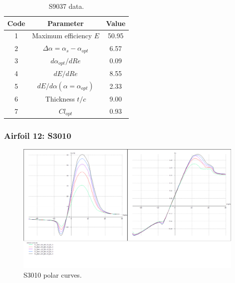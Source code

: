 \documentclass[../TFG_Annex.tex]{subfiles}
\begin{document}
\begin{table}[h!]
	\centering
	\begin{tabular}{c|c|c}
		Code & Parameter                                    & Value  \\ \hline
		1    & Maximum efficiency $E$                      &   50.95       \\
		2    & $\Delta \alpha=\alpha_{s}-\alpha_{opt}$    &         6.57          \\
		3    & ${d\alpha_{opt}}/{dRe}$                     &            0.09     \\
		4    & ${dE}/{dRe}$                                &        8.55     \\
		5    & ${dE}/{d \alpha} (\alpha=\alpha_{opt})$      &           2.33        \\
		6    & Thickness $t/c$                            &              9.00      \\
		7    & $Cl_{opt}$  &   0.93
	\end{tabular}
	\caption{S9037 data.}
	\label{tab:Airf11}
\end{table}




\newpage
\subsubsection{Airfoil 12: S3010}


\begin{figure}[h!]
	\centering
	\includegraphics[width=1\linewidth]{"../../04-Airfoil selection/Imatges airfoils/12-S3010"}
	\caption{S3010 polar curves.}
	\label{fig:12-s3010}
\end{figure}
\end{document}
